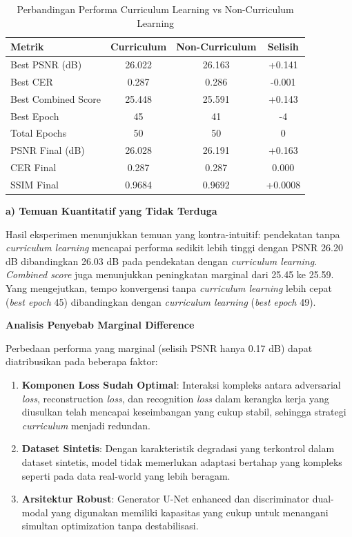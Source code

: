 \documentclass[12pt,a4paper]{article}
\begin{document}
\begin{table}[H]
\centering
\caption{Perbandingan Performa Curriculum Learning vs Non-Curriculum Learning}
\label{tab:curriculum-comparison}
\begin{tabular}{lccc}
\toprule
\textbf{Metrik} & \textbf{Curriculum} & \textbf{Non-Curriculum} & \textbf{Selisih} \\
\midrule
Best PSNR (dB) & 26.022 & 26.163 & +0.141 \\
Best CER & 0.287 & 0.286 & -0.001 \\
Best Combined Score & 25.448 & 25.591 & +0.143 \\
Best Epoch & 45 & 41 & -4 \\
Total Epochs & 50 & 50 & 0 \\
\midrule
PSNR Final (dB) & 26.028 & 26.191 & +0.163 \\
CER Final & 0.287 & 0.287 & 0.000 \\
SSIM Final & 0.9684 & 0.9692 & +0.0008 \\
\bottomrule
\end{tabular}
\end{table}

\textbf{a) Temuan Kuantitatif yang Tidak Terduga}

Hasil eksperimen menunjukkan temuan yang kontra-intuitif: pendekatan tanpa \textit{curriculum learning} mencapai performa sedikit lebih tinggi dengan PSNR 26.20 dB dibandingkan 26.03 dB pada pendekatan dengan \textit{curriculum learning}. \textit{Combined score} juga menunjukkan peningkatan marginal dari 25.45 ke 25.59. Yang mengejutkan, tempo konvergensi tanpa \textit{curriculum learning} lebih cepat (\textit{best epoch} 45) dibandingkan dengan \textit{curriculum learning} (\textit{best epoch} 49).

\textbf{Analisis Penyebab Marginal Difference}

Perbedaan performa yang marginal (selisih PSNR hanya 0.17 dB) dapat diatribusikan pada beberapa faktor:

\begin{enumerate}[leftmargin=*]
\item\textbf{Komponen Loss Sudah Optimal}: Interaksi kompleks antara adversarial \textit{loss}, reconstruction \textit{loss}, dan recognition \textit{loss} dalam kerangka kerja yang diusulkan telah mencapai keseimbangan yang cukup stabil, sehingga strategi \textit{curriculum} menjadi redundan.

\item\textbf{Dataset Sintetis}: Dengan karakteristik degradasi yang terkontrol dalam dataset sintetis, model tidak memerlukan adaptasi bertahap yang kompleks seperti pada data real-world yang lebih beragam.

\item\textbf{Arsitektur Robust}: Generator U-Net enhanced dan discriminator dual-modal yang digunakan memiliki kapasitas yang cukup untuk menangani simultan optimization tanpa destabilisasi.
\end{enumerate}
\end{document}
